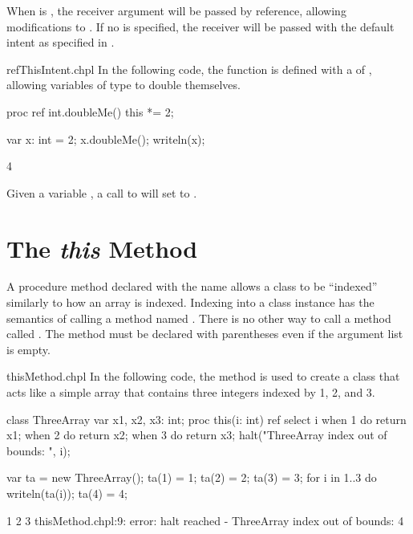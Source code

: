 When  is , the receiver argument will be
passed by reference, allowing modifications to .  If
no  is specified, the receiver will be passed with
the default intent as specified in .

\begin{chapelexample}{refThisIntent.chpl}
In the following code, the  function is defined with a
 of , allowing variables of type  to
double themselves.
\begin{chapel}
proc ref int.doubleMe() { this *= 2; }
\end{chapel}
\begin{chapelpost}
var x: int = 2;
x.doubleMe();
writeln(x);
\end{chapelpost}
\begin{chapeloutput}
4
\end{chapeloutput}
Given a variable , a call to  will set 
to .
\end{chapelexample}

\section{The {\em this} Method}
\label{The_em_this_Method}

A procedure method declared with the name  allows a class to be
``indexed'' similarly to how an array is indexed.  Indexing into a
class instance has the semantics of calling a method
named .  There is no other way to call a method
called .  The  method must be declared with
parentheses even if the argument list is empty.

\begin{chapelexample}{thisMethod.chpl}
In the following code, the  method is used to create a
class that acts like a simple array that contains three integers
indexed by 1, 2, and 3.
\begin{chapel}
class ThreeArray {
  var x1, x2, x3: int;
  proc this(i: int) ref {
    select i {
      when 1 do return x1;
      when 2 do return x2;
      when 3 do return x3;
    }
    halt("ThreeArray index out of bounds: ", i);
  }
}
\end{chapel}
\begin{chapelpost}
var ta = new ThreeArray();
ta(1) = 1;
ta(2) = 2;
ta(3) = 3;
for i in 1..3 do
  writeln(ta(i));
ta(4) = 4;
\end{chapelpost}
\begin{chapeloutput}
1
2
3
thisMethod.chpl:9: error: halt reached - ThreeArray index out of bounds: 4
\end{chapeloutput}
\end{chapelexample}

